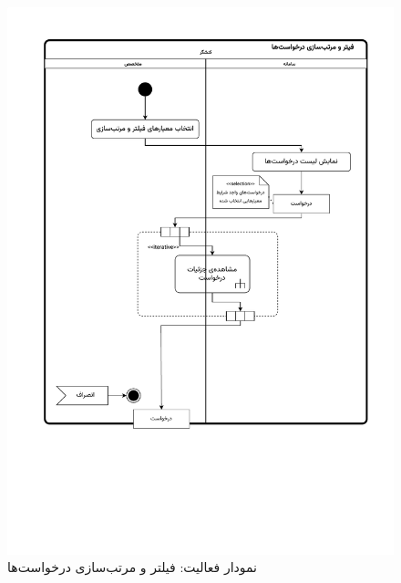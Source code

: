 \begin{figure}[ht!]
	\centering
	\includegraphics[scale=0.6, page=1]{figs/OOD-activity-filterreq.pdf}
	\caption{نمودار فعالیت: فیلتر و مرتب‌سازی درخواست‌ها}
\end{figure}
\FloatBarrier
\newpage

